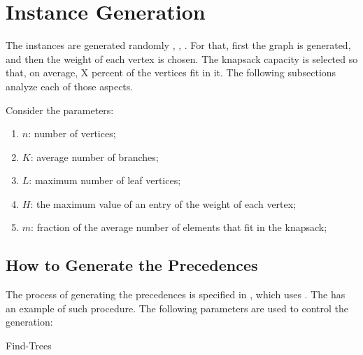 \section{Instance Generation}

The instances are generated randomly \cite{bib:instances-CVRP}, \cite{bib:constrained-knapsack}, \cite{bib:grasp-and-tabu}. For that, first the graph is generated, and then the weight of each vertex is chosen. The knapsack capacity is selected so that, on average, X percent of the vertices fit in it. The following subsections analyze each of those aspects.

Consider the parameters:
\begin{enumerate}
    \item $n$: number of vertices;
    \item $K$: average number of branches;
    \item $L$: maximum number of leaf vertices;
    \item $H$: the maximum value of an entry of the weight of each vertex;
    \item $m$: fraction of the average number of elements that fit in the knapsack;
\end{enumerate}

\subsection{How to Generate the Precedences}

The process of generating the precedences is specified in , which uses . The  has an example of such procedure. The following parameters are used to control the generation:

\begin{algorithm}
    \caption{Find-Trees}
    \label{algorith:find-trees}
    \begin{algorithmic}[1]
            \\
            \Else
            \EndIf
        \EndFor
        \\
    \end{algorithmic}
\end{algorithm}

